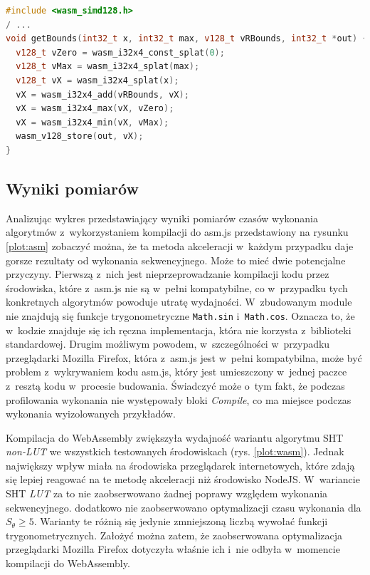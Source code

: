 \begin{lstlisting}[language=C++, float=ht, label=lst:simd, caption=Funkcja \lstinline{getBounds} algorytmu CHT z~wykorzystaniem instrukcji SIMD.]
#include <wasm_simd128.h>
/ ...
void getBounds(int32_t x, int32_t max, v128_t vRBounds, int32_t *out) {
  v128_t vZero = wasm_i32x4_const_splat(0);
  v128_t vMax = wasm_i32x4_splat(max);
  v128_t vX = wasm_i32x4_splat(x);
  vX = wasm_i32x4_add(vRBounds, vX);
  vX = wasm_i32x4_max(vX, vZero);
  vX = wasm_i32x4_min(vX, vMax);
  wasm_v128_store(out, vX);
}
\end{lstlisting}








\subsection{Wyniki pomiarów}

Analizując wykres przedstawiający wyniki pomiarów czasów wykonania algorytmów z~wykorzystaniem kompilacji do asm.js przedstawiony na rysunku \ref{plot:asm} zobaczyć można, że ta metoda akceleracji w~każdym przypadku daje gorsze rezultaty od wykonania sekwencyjnego. Może to mieć dwie potencjalne przyczyny. Pierwszą z~nich jest nieprzeprowadzanie kompilacji kodu przez środowiska, które z~asm.js nie są w~pełni kompatybilne, co w~przypadku tych konkretnych algorytmów powoduje utratę wydajności. W~zbudowanym module nie znajdują się funkcje trygonometryczne \lstinline{Math.sin} i~\lstinline{Math.cos}. Oznacza to, że w~kodzie znajduje się ich ręczna implementacja, która nie korzysta z~biblioteki standardowej. Drugim możliwym powodem, w~szczególności w~przypadku przeglądarki Mozilla Firefox, która z~asm.js jest w~pełni kompatybilna, może być problem z~wykrywaniem kodu asm.js, który jest umieszczony w~jednej paczce z~resztą kodu w~procesie budowania. Świadczyć może o~tym fakt, że podczas profilowania wykonania nie występowały bloki \textit{Compile}, co ma miejsce podczas wykonania wyizolowanych przykładów.

Kompilacja do WebAssembly zwiększyła wydajność wariantu algorytmu SHT \textit{non-LUT} we wszystkich testowanych środowiskach (rys. \ref{plot:wasm}). Jednak największy wpływ miała na środowiska przeglądarek internetowych, które zdają się lepiej reagować na te metodę akceleracji niż środowisko NodeJS. W~wariancie SHT \textit{LUT} za to nie zaobserwowano żadnej poprawy względem wykonania sekwencyjnego. dodatkowo nie zaobserwowano optymalizacji czasu wykonania dla $S_\theta \geq 5$. Warianty te różnią się jedynie zmniejszoną liczbą wywołać funkcji trygonometrycznych. Założyć można zatem, że zaobserwowana optymalizacja przeglądarki Mozilla Firefox dotyczyła właśnie ich i~nie odbyła w~momencie kompilacji do WebAssembly. 

